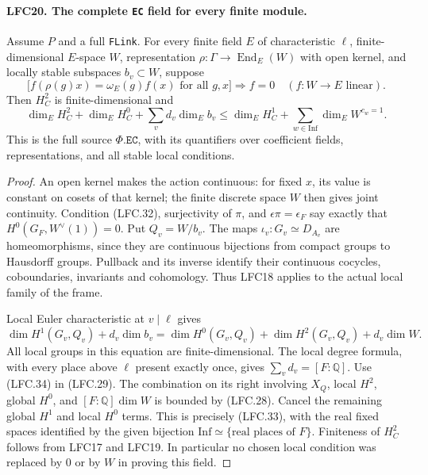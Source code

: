 \paragraph{LFC20. The complete \texttt{EC} field for every finite module.}
\label{claim:LFC20}
Assume \(P\) and a full \texttt{FLink}.
For every finite field \(E\) of characteristic \(\ell\),
finite-dimensional \(E\)-space \(W\), representation
\(\rho:\Gamma\to\operatorname{End}_E(W)\) with open kernel,
and locally stable subspaces \(b_v\subset W\), suppose
\[
 \bigl[f(\rho(g)x)=\omega_E(g)f(x)
           \text{ for all }g,x\bigr]\Longrightarrow f=0
                   \quad(f:W\to E\text{ linear}).        \tag{LFC.32}
\]
Then \(H^2_C\) is finite-dimensional and
\[
 \dim_E H^2_C+\dim_E H^0_C+\sum_v d_v\dim_E b_v
 \le \dim_E H^1_C+
                 \sum_{w\in\mathrm{Inf}}\dim_E W^{c_w=1}.
                                                        \tag{LFC.33}
\]
This is the full source \(\Phi.\texttt{EC}\), with its
quantifiers over coefficient fields, representations,
and all stable local conditions.

\begin{proof}
An open kernel makes the action continuous: for fixed
\(x\), its value is constant on cosets of that kernel;
the finite discrete space \(W\) then gives joint
continuity.  Condition (LFC.32), surjectivity of \(\pi\),
and \(\epsilon\pi=\epsilon_F\) say exactly that
\(H^0(G_F,W^\vee(1))=0\).
Put \(Q_v=W/b_v\).
The maps \(\iota_v:G_v\simeq D_{A_v}\) are homeomorphisms,
since they are continuous bijections from compact
groups to Hausdorff groups.  Pullback and its inverse
identify their continuous cocycles, coboundaries,
invariants and cohomology.  Thus LFC18 applies to
the actual local family of the frame.

Local Euler characteristic at \(v\mid\ell\) gives
\[
 \dim H^1(G_v,Q_v)+d_v\dim b_v
 =\dim H^0(G_v,Q_v)+\dim H^2(G_v,Q_v)+d_v\dim W.
                                                        \tag{LFC.34}
\]
All local groups in this equation are finite-dimensional.
The local degree formula, with every place above \(\ell\)
present exactly once, gives
\(\sum_v d_v=[F:\mathbb Q]\).
Use (LFC.34) in (LFC.29).
The combination on its right involving \(X_Q\), local
\(H^2\), global \(H^0\), and \([F:\mathbb Q]\dim W\)
is bounded by (LFC.28).
Cancel the remaining global \(H^1\) and local \(H^0\)
terms.  This is precisely (LFC.33), with the real
fixed spaces identified by the given bijection
\(\mathrm{Inf}\simeq\{\text{real places of }F\}\).
Finiteness of \(H^2_C\) follows from LFC17 and LFC19.
In particular no chosen local condition was replaced
by \(0\) or by \(W\) in proving this field.
\end{proof}

